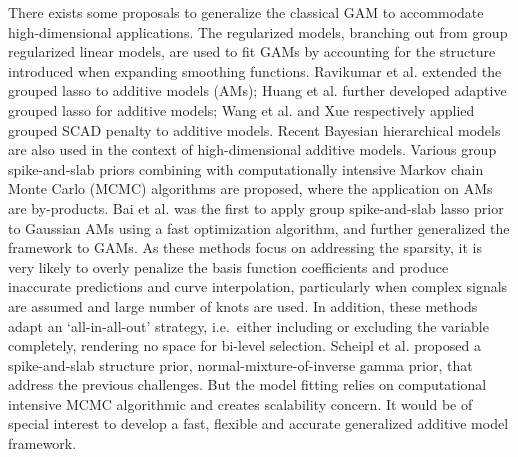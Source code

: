 \documentclass[AMA,STIX1COL,]{WileyNJD-v2}
\begin{document}
There exists some proposals to generalize the classical GAM to
accommodate high-dimensional applications. The regularized models,
branching out from group regularized linear models, are used to fit GAMs
by accounting for the structure introduced when expanding smoothing
functions. Ravikumar et al. \citep{Ravikumar2009} extended the grouped
lasso \citep{Yuan2006} to additive models (AMs); Huang et al.
\citep{Huang2010} further developed adaptive grouped lasso for additive
models; Wang et al. \citep{Wang2007} and Xue \citep{Xue2009}
respectively applied grouped SCAD penalty \citep{Fan2001} to additive
models. Recent Bayesian hierarchical models are also used in the context
of high-dimensional additive models. Various group spike-and-slab priors
combining with computationally intensive Markov chain Monte Carlo (MCMC)
algorithms \citep{Xu2015, Yang2020} are proposed, where the application
on AMs are by-products. Bai et al. \citep{Bai2020} was the first to
apply group spike-and-slab lasso prior to Gaussian AMs using a fast
optimization algorithm, and further generalized the framework to
GAMs\citep{Bai2021}. As these methods focus on addressing the sparsity,
it is very likely to overly penalize the basis function coefficients and
produce inaccurate predictions and curve interpolation, particularly
when complex signals are assumed and large number of knots are used.
\citep{Scheipl2013} In addition, these methods adapt an `all-in-all-out'
strategy, i.e.~either including or excluding the variable completely,
rendering no space for bi-level selection. Scheipl et al.
\citep{Scheipl2012} proposed a spike-and-slab structure prior,
normal-mixture-of-inverse gamma prior, that address the previous
challenges. But the model fitting relies on computational intensive MCMC
algorithmic and creates scalability concern. It would be of special
interest to develop a fast, flexible and accurate generalized additive
model framework.
\end{document}
